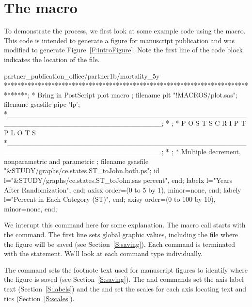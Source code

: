 \documentclass[nojss]{jss}\usepackage[]{graphicx}\usepackage[]{color}
\begin{document}
\section[The plot.sas macro]{The  macro}\label{S:plot.sas}
To demonstrate the process, we first look at some example code using the  macro. This code is intended to generate a figure for manuscript publication and was modified to generate Figure~\ref{F:introFigure}. Note the first line of the code block indicates the location of the file.

\begin{CodeChunk}\small
\begin{CodeInput}
partner_publication_office/partner1b/mortality_5y
*******************************************************************************;
* Bring in PostScript plot macro                                               ;
filename plt "!MACROS/plot.sas"; %
filename gsasfile pipe 'lp';
*______________________________________________________________________________;
*                                                                              ;
*                       P O S T S C R I P T   P L O T S
*______________________________________________________________________________;
*                                                                              ;
* Multiple decrement, nonparametric and parametric                             ;
filename gsasfile "&STUDY/graphs/ce.states.ST_toJohn.both.ps";
id l="&STUDY/graphs/ce.states.ST_toJohn.sas percent", end;
labelx l="Years After Randomization", end;
axisx order=(0 to 5 by 1), minor=none, end;
labely l="Percent in Each Category (ST)", end;
axisy order=(0 to 100 by 10), minor=none, end;
\end{CodeInput}
\end{CodeChunk}

We interupt this command here for some explanation. The  macro call starts with the  command. The first line sets global graphic values, including the file where the figure will be saved (see Section~\ref{S:saving}). Each  command is terminated with the  statement. We'll look at each command type individually.

The  command sets the footnote text used for manuscript figures to identify where the figure is saved (see Section~\ref{S:saving}). The  and  commands set the axis label text (Section~\ref{S:labels}) and the  and  set the scales for each axis locating text and tics (Section~\ref{S:scales}).
\end{document}
